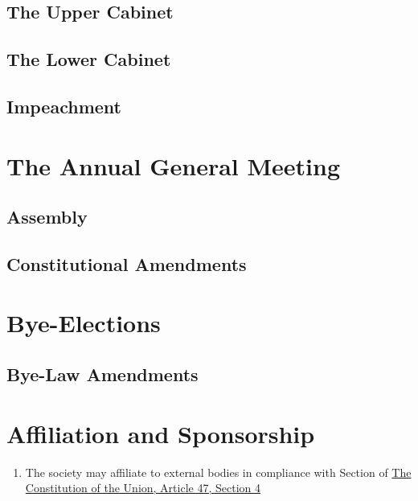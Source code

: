\documentclass{scrartcl}
\begin{document}
        \subsection{The Upper Cabinet}
            \label{executive--upper-cabinet}

        \subsection{The Lower Cabinet}
            \label{executive--lower-cabinet}

        \subsection{Impeachment}
            \label{executive--impeachment}

    \clearpage
    \section{The Annual General Meeting}
        \label{agm}
        \subsection{Assembly}
            \label{agm--assembly}

        \subsection{Constitutional Amendments}
            \label{agm--consitutional-amendment}

    \clearpage
    \section{Bye-Elections}
        \label{bye-election}
        \subsection{Bye-Law Amendments}
            \label{bye-election--bye-law-amendment}

    \clearpage
    \section{Affiliation and Sponsorship}
        \label{affiliation}
        \begin{enumerate}
            \item The society may affiliate to external bodies in compliance with Section of \href{https://lancastersu.co.uk/resources/articles-of-association-2023/download_attachment}{The Constitution of the Union, Article 47, Section 4}
        \end{enumerate}
\end{document}
